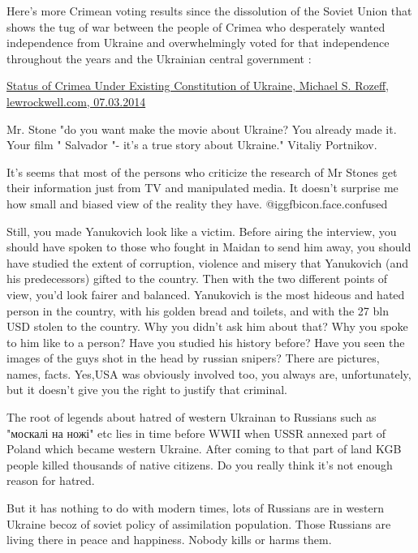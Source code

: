 \begin{itemize}
Here's more Crimean voting results since the dissolution of the Soviet Union
that shows the tug of war between the people of Crimea who desperately wanted
independence from Ukraine and overwhelmingly voted for that independence
throughout the years and the Ukrainian central government :

\href{https://www.lewrockwell.com/lrc-blog/status-of-crimea-under-existing-constitution-of-ukraine/}{%
Status of Crimea Under Existing Constitution of Ukraine, Michael S. Rozeff, lewrockwell.com, 07.03.2014%
}


Mr. Stone "do you want make the movie about Ukraine? You already made it. Your
film " Salvador "- it's a true story about Ukraine." Vitaliy Portnikov.



It's seems that most of the persons who criticize the research of Mr Stones get
their information just from TV and manipulated media. It doesn't surprise me
how small and biased view of the reality they have.  @igg{fbicon.face.confused} 



Still, you made Yanukovich look like a victim. Before airing the interview, you
should have spoken to those who fought in Maidan to send him away, you should
have studied the extent of corruption, violence and misery that Yanukovich (and
his predecessors) gifted to the country. Then with the two different points of
view, you'd look fairer and balanced. Yanukovich is the most hideous and hated
person in the country, with his golden bread and toilets, and with the 27 bln
USD stolen to the country. Why you didn't ask him about that? Why you spoke to
him like to a person? Have you studied his history before? Have you seen the
images of the guys shot in the head by russian snipers? There are pictures,
names, facts. Yes,USA was obviously involved too, you always are,
unfortunately, but it doesn't give you the right to justify that criminal.



The root of legends about hatred of western Ukrainan to Russians such as
"москалі на ножі" etc lies in time before WWII when USSR annexed part of Poland
which became western Ukraine. After coming to that part of land KGB people
killed thousands of native citizens. Do you really think it's not enough reason
for hatred.

But it has nothing to do with modern times, lots of Russians are in western
Ukraine becoz of soviet policy of assimilation population. Those Russians are
living there in peace and happiness. Nobody kills or harms them.


\end{itemize}
